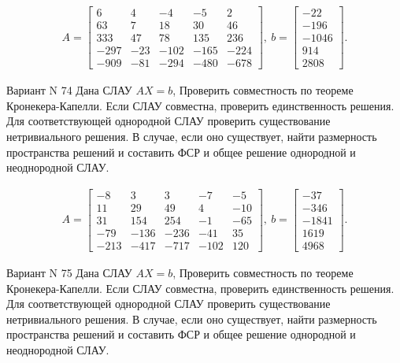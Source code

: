 \documentclass[11pt]{report}
\begin{document}
\begin{align*}
 A = \left[\begin{matrix}6 & 4 & -4 & -5 & 2\\63 & 7 & 18 & 30 & 46\\333 & 47 & 78 & 135 & 236\\-297 & -23 & -102 & -165 & -224\\-909 & -81 & -294 & -480 & -678\end{matrix}\right],
\ b = \left[\begin{matrix}-22\\-196\\-1046\\914\\2808\end{matrix}\right]. 
 \end{align*}

Вариант N 74
Дана СЛАУ $AX = b$,
Проверить совместность по теореме Кронекера-Капелли. Если СЛАУ совместна, проверить единственность решения.
Для соответствующей однородной СЛАУ проверить существование нетривиального решения. В случае, если оно существует,
найти размерность пространства решений и составить ФСР и общее решение однородной  и неоднородной СЛАУ.


\begin{align*}
 A = \left[\begin{matrix}-8 & 3 & 3 & -7 & -5\\11 & 29 & 49 & 4 & -10\\31 & 154 & 254 & -1 & -65\\-79 & -136 & -236 & -41 & 35\\-213 & -417 & -717 & -102 & 120\end{matrix}\right],
\ b = \left[\begin{matrix}-37\\-346\\-1841\\1619\\4968\end{matrix}\right]. 
 \end{align*}

Вариант N 75
Дана СЛАУ $AX = b$,
Проверить совместность по теореме Кронекера-Капелли. Если СЛАУ совместна, проверить единственность решения.
Для соответствующей однородной СЛАУ проверить существование нетривиального решения. В случае, если оно существует,
найти размерность пространства решений и составить ФСР и общее решение однородной  и неоднородной СЛАУ.
\end{document}
